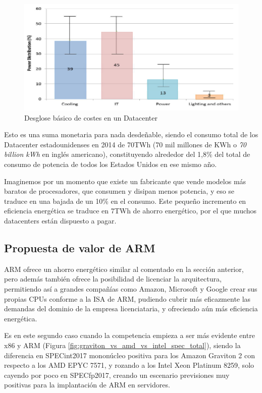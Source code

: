 \documentclass[a4paper,openright,12pt]{article}
\begin{document}
\begin{figure}[h]
\includegraphics[width=\textwidth]{img/data_center_power_consumption.png}
\caption{Desglose básico de costes en un Datacenter\\\parencite{datacenter_energy_cost_SONG20151255}}
\label{fig:datacenter_energy_cost}
\end{figure}

Esto es una suma monetaria para nada desdeñable, siendo el consumo total de los Datacenter estadounidenses en 2014 de 70TWh (70 mil millones de KWh o \emph{70 billion kWh} en inglés americano),
constituyendo alrededor del 1,8\% del total de consumo de potencia de todos los Estados Unidos en ese mismo año. \autocite[7]{usa_datacenter_energy_usage_report_61109}

Imaginemos por un momento que existe un fabricante que vende modelos más baratos de procesadores, que consumen y disipan menos potencia, y eso se traduce en una bajada de un 10\% en el consumo.
Este pequeño incremento en eficiencia energética se traduce en 7TWh de ahorro energético, por el que muchos datacenters están dispuesto a pagar.

\subsection{Propuesta de valor de ARM}
ARM ofrece un ahorro energético similar al comentado en la sección anterior, pero además también ofrece la posibilidad de licenciar la arquitectura, permitiendo así a grandes compañías
como Amazon, Microsoft y Google crear sus propias CPUs conforme a la ISA de ARM, pudiendo cubrir más eficazmente las demandas del dominio de la empresa licenciataria, y ofreciendo aún más
eficiencia energética.

Es en este segundo caso cuando la competencia empieza a ser más evidente entre x86 y ARM (Figura \ref{fig:graviton_vs_amd_vs_intel_spec_total}), siendo la diferencia en SPECint2017 mononúcleo positiva para los Amazon Graviton 2 con respecto
a los AMD EPYC 7571, y rozando a los Intel Xeon Platinum 8259, solo cayendo por poco en SPECfp2017, creando un escenario previsiones muy positivas para la implantación de ARM
en servidores. \parencite{graviton2_vs_amd_vs_intel_cloud_compute}
\end{document}
